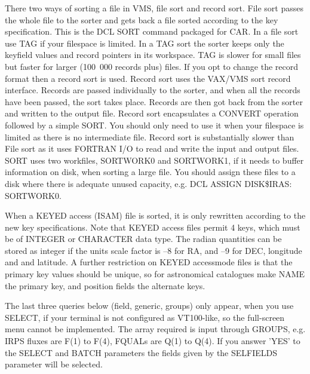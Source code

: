 There two ways of sorting a file in VMS, file sort and record sort.
File sort passes the whole file to the sorter and gets back a  file sorted
according  to  the  key  specification.
This is the DCL SORT command packaged for CAR.
In a file sort use TAG if your filespace is limited.
In a TAG sort the sorter keeps only the keyfield values and record pointers
in its workspace.
TAG is slower for small files but faster for larger (100~000 records plus)
files.
If you opt to change the record format then a record sort is used.
Record sort uses the VAX/VMS sort record interface.
Records are passed individually to the sorter, and when all the records have
been passed, the sort takes place.
Records are then got back from the sorter and written to the output file.
Record sort encapsulates a CONVERT operation followed by a simple SORT.
You should only need to use it when your filespace is limited as there is no
intermediate file.
Record sort is substantially slower than File sort as it uses FORTRAN I/O
to read and write the input and output files.
SORT uses two workfiles, SORTWORK0 and SORTWORK1, if it needs to buffer
information on disk, when sorting a large file.
You should assign these files to a disk where there is adequate unused
capacity, e.g. DCL ASSIGN DISK\$IRAS: SORTWORK0.

When a KEYED access (ISAM) file is sorted, it is only rewritten according
to the new key specifications.
Note that KEYED access files permit 4 keys, which must be of INTEGER or
CHARACTER data type.
The radian quantities can be stored as integer if the units scale factor is
--8 for RA, and --9 for DEC, longitude and and latitude.
A further restriction on KEYED accessmode files is that the primary key
values should be unique, so for astronomical catalogues make NAME the
primary key, and position fields the alternate keys.

The last three queries below (field, generic, groups) only appear, when you use
SELECT, if your terminal is not configured as VT100-like, so the full-screen
menu cannot be implemented.
The array required is input through GROUPS, e.g. IRPS fluxes are F(1) to
F(4), FQUALs are Q(1) to Q(4).
If you answer 'YES' to the SELECT and BATCH parameters the fields given by the
SELFIELDS parameter will be selected.

